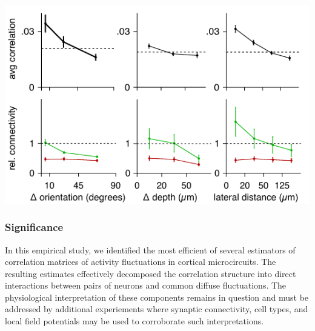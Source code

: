\documentclass[12pt]{amsart}
\newenvironment{Figure}
  {\par\medskip\noindent\minipage{\linewidth}}
  {\endminipage\par\medskip}
\begin{document}
\begin{multicols}{2}
\begin{Figure}
  \centering
  \includegraphics{./Summary.pdf}
  \label{fig:summary}
\end{Figure}
\end{multicols}

\subsubsection*{Significance}
In this empirical study, we identified the most efficient of several estimators of correlation matrices of activity fluctuations in cortical microcircuits. The resulting estimates effectively decomposed the correlation structure into direct interactions between pairs of neurons and common diffuse fluctuations. The physiological interpretation of these components remains in question and must be addressed by additional experiements where synaptic connectivity, cell types, and local field potentials may be used to corroborate such interpretations. 




\end{document}
